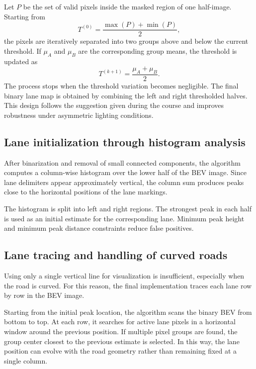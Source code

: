 \documentclass[conference]{IEEEtran}
\begin{document}
Let $P$ be the set of valid pixels inside the masked region of one half-image. Starting from
\begin{equation}
T^{(0)} = \frac{\max(P) + \min(P)}{2},
\end{equation}
the pixels are iteratively separated into two groups above and below the current threshold. If $\mu_A$ and $\mu_B$ are the corresponding group means, the threshold is updated as
\begin{equation}
T^{(k+1)} = \frac{\mu_A + \mu_B}{2}.
\end{equation}
The process stops when the threshold variation becomes negligible. The final binary lane map is obtained by combining the left and right thresholded halves. This design follows the suggestion given during the course and improves robustness under asymmetric lighting conditions.

\subsection{Lane initialization through histogram analysis}
After binarization and removal of small connected components, the algorithm computes a column-wise histogram over the lower half of the BEV image. Since lane delimiters appear approximately vertical, the column sum produces peaks close to the horizontal positions of the lane markings.

The histogram is split into left and right regions. The strongest peak in each half is used as an initial estimate for the corresponding lane. Minimum peak height and minimum peak distance constraints reduce false positives.

\subsection{Lane tracing and handling of curved roads}
Using only a single vertical line for visualization is insufficient, especially when the road is curved. For this reason, the final implementation traces each lane row by row in the BEV image.

Starting from the initial peak location, the algorithm scans the binary BEV from bottom to top. At each row, it searches for active lane pixels in a horizontal window around the previous position. If multiple pixel groups are found, the group center closest to the previous estimate is selected. In this way, the lane position can evolve with the road geometry rather than remaining fixed at a single column.
\end{document}
